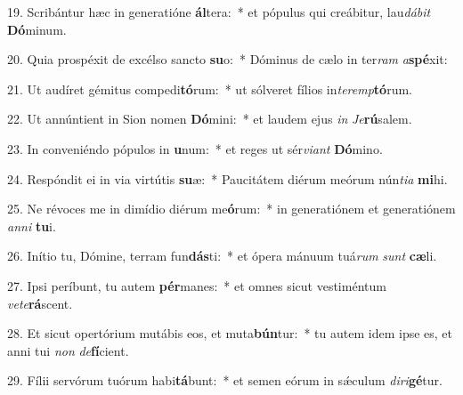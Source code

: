 19. Scribántur hæc in generatióne \textbf{ál}tera:~*  et pópulus qui creábitur, lau\textit{dá}\textit{bit} \textbf{Dó}minum.\

20. Quia prospéxit de excélso sancto \textbf{su}o:~*  Dóminus de cælo in ter\textit{ram} \textit{a}\textbf{spé}xit:\

21. Ut audíret gémitus compedi\textbf{tó}rum:~*  ut sólveret fílios in\textit{ter}\textit{emp}\textbf{tó}rum.\

22. Ut annúntient in Sion nomen \textbf{Dó}mini:~*  et laudem ejus \textit{in} \textit{Je}\textbf{rú}salem.\

23. In conveniéndo pópulos in \textbf{u}num:~*  et reges ut sér\textit{vi}\textit{ant} \textbf{Dó}mino.\

24. Respóndit ei in via virtútis \textbf{su}æ:~*  Paucitátem diérum meórum nún\textit{ti}\textit{a} \textbf{mi}hi.\

25. Ne révoces me in dimídio diérum me\textbf{ó}rum:~*  in generatiónem et generatiónem \textit{an}\textit{ni} \textbf{tu}i.\

26. Inítio tu, Dómine, terram fun\textbf{dás}ti:~*  et ópera mánuum tuá\textit{rum} \textit{sunt} \textbf{cæ}li.\

27. Ipsi períbunt, tu autem \textbf{pér}manes:~*  et omnes sicut vestiméntum \textit{ve}\textit{te}\textbf{rá}scent.\

28. Et sicut opertórium mutábis eos, et muta\textbf{bún}tur:~*  tu autem idem ipse es, et anni tui \textit{non} \textit{de}\textbf{fí}cient.\

29. Fílii servórum tuórum habi\textbf{tá}bunt:~*  et semen eórum in sǽculum \textit{di}\textit{ri}\textbf{gé}tur.\

